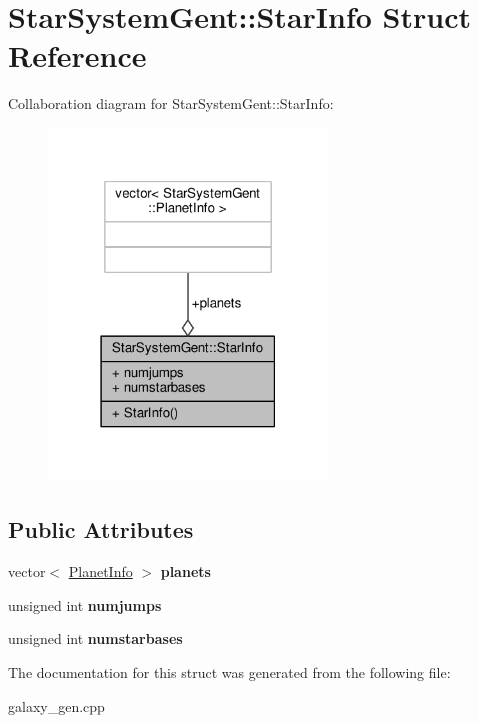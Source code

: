 \hypertarget{structStarSystemGent_1_1StarInfo}{}\section{Star\+System\+Gent\+:\+:Star\+Info Struct Reference}
\label{structStarSystemGent_1_1StarInfo}


Collaboration diagram for Star\+System\+Gent\+:\+:Star\+Info\+:
\nopagebreak
\begin{figure}[H]
\begin{center}
\leavevmode
\includegraphics[width=210pt]{d7/d0a/structStarSystemGent_1_1StarInfo__coll__graph}
\end{center}
\end{figure}
\subsection*{Public Attributes}
\begin{DoxyCompactItemize}
\item 
vector$<$ \hyperlink{structStarSystemGent_1_1PlanetInfo}{Planet\+Info} $>$ {\bfseries planets}\hypertarget{structStarSystemGent_1_1StarInfo_a68fe92302ccd2c203a297a7f05f966a2}{}\label{structStarSystemGent_1_1StarInfo_a68fe92302ccd2c203a297a7f05f966a2}

\item 
unsigned int {\bfseries numjumps}\hypertarget{structStarSystemGent_1_1StarInfo_a0c7df1b079f08dabce31eba428b6b319}{}\label{structStarSystemGent_1_1StarInfo_a0c7df1b079f08dabce31eba428b6b319}

\item 
unsigned int {\bfseries numstarbases}\hypertarget{structStarSystemGent_1_1StarInfo_abfd0d08b4889d890efd43ceeaca057c1}{}\label{structStarSystemGent_1_1StarInfo_abfd0d08b4889d890efd43ceeaca057c1}

\end{DoxyCompactItemize}


The documentation for this struct was generated from the following file\+:\begin{DoxyCompactItemize}
\item 
galaxy\+\_\+gen.\+cpp\end{DoxyCompactItemize}
